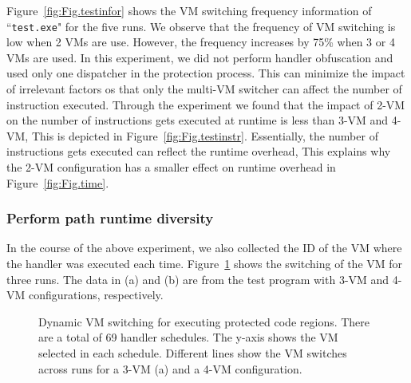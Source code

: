 \documentclass[preprint,12pt,3p]{elsarticle}
\begin{document}
Figure~\ref{fig:Fig.testinfor} shows the VM switching frequency information of ``\texttt{test.exe}" for the five runs.
We observe that the frequency of VM switching is low when 2 VMs are use.
However, the frequency increases by 75\% when 3 or 4 VMs are used.
In this experiment, we did not perform handler obfuscation and used only one dispatcher in the protection process.
This can minimize the impact of irrelevant factors os that only the multi-VM switcher can affect the number of instruction executed.
Through the experiment we found that the impact of 2-VM on the number of instructions gets executed at runtime is less than 3-VM and 4-VM,
This is depicted in Figure~\ref{fig:Fig.testinstr}.
Essentially, the number of instructions gets executed can reflect the runtime overhead,
This explains why the 2-VM configuration has a smaller effect on runtime overhead in Figure~\ref{fig:Fig.time}.



\subsubsection{Perform path runtime diversity}
In the course of the above experiment, we also collected the ID of the VM where the handler was executed each time.
Figure~\ref{fig:Fig.execvm} shows the switching of the VM for three runs.
The data in (a) and (b) are from the test program with 3-VM and 4-VM configurations, respectively.

\begin{figure}[t]
\centering
{}
\caption{Dynamic VM switching for executing protected code regions. There are a total of 69 handler schedules.
The y-axis shows the VM selected in each schedule. Different lines show the VM switches across runs for a 3-VM (a) and a 4-VM configuration.}\label{fig:Fig.execvm}
\end{figure}
\end{document}
